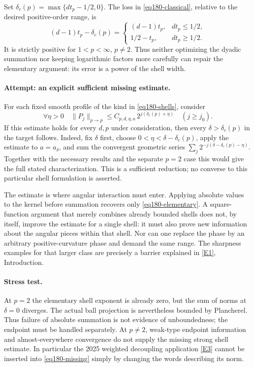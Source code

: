 \documentclass[11pt,a4paper]{article}
\newcommand{\eref}[2]{\hyperlink{extra:#1:#2}{[E#2]}}
\numberwithin{equation}{section}
\begin{document}
Set $\delta_c(p)=\max\{dt_p-1/2,0\}$. The loss in
\eqref{eq180-classical}, relative to the desired positive-order range, is
\begin{equation}\label{eq180-loss}
 (d-1)t_p-\delta_c(p)=
 \begin{cases}(d-1)t_p,&dt_p\le1/2,\\
               1/2-t_p,&dt_p\ge1/2.
 \end{cases}
\end{equation}
It is strictly positive for $1<p<\infty$, $p\ne2$. Thus neither optimizing
the dyadic summation nor keeping logarithmic factors more carefully can
repair the elementary argument: its error is a power of the shell width.

\paragraph{Attempt: an explicit sufficient missing estimate.}
For each fixed smooth profile of the kind in \eqref{eq180-shells}, consider
\begin{equation}\label{eq180-missing}
 \forall\eta>0\quad
 \|P_j\|_{p\to p}\le C_{p,d,\eta,a}\,
                         2^{j(\delta_c(p)+\eta)}
                  \quad(j\ge j_0).
\end{equation}
If this estimate holds for every $d,p$ under consideration, then every
$\delta>\delta_c(p)$ in the target follows. Indeed, fix $\delta$ first,
choose $0<\eta<\delta-\delta_c(p)$, apply the estimate to
$a=a_\delta$, and sum the convergent geometric series
$\sum_j2^{-j(\delta-\delta_c(p)-\eta)}$.
Together with the necessary results and the separate $p=2$ case this
would give the full stated characterization. This is a sufficient
reduction; no converse to this particular shell formulation is asserted.

The estimate is where angular interaction must enter. Applying absolute
values to the kernel before summation recovers only
\eqref{eq180-elementary}. A square-function argument that merely combines
already bounded shells does not, by itself, improve the estimate for a
single shell: it must also prove new information about the angular pieces
within that shell. Nor can one replace the phase by an arbitrary
positive-curvature phase and demand the same range. The sharpness examples
for that larger class are precisely a barrier explained in
\eref{statement}{1}, Introduction.

\paragraph{Stress test.}
At $p=2$ the elementary shell exponent is already zero, but the sum of
norms at $\delta=0$ diverges. The actual ball projection is nevertheless
bounded by Plancherel. Thus failure of absolute summation is not evidence
of unboundedness; the endpoint must be handled separately. At $p\ne2$,
weak-type endpoint information and almost-everywhere convergence do not
supply the missing strong shell estimate. In particular the 2025 weighted
decoupling application \eref{statement}{3} cannot be inserted into
\eqref{eq180-missing} simply by changing the words describing its norm.
\end{document}
